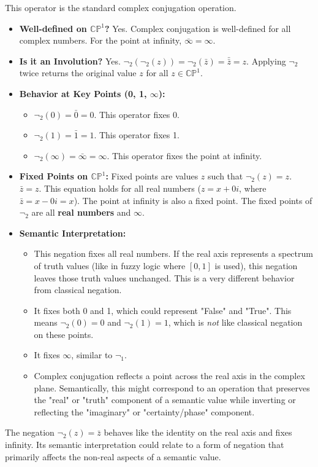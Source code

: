 	This operator is the standard complex conjugation operation.
	
	\begin{itemize}
		\item \textbf{Well-defined on $\mathbb{CP}^1$?} Yes. Complex conjugation is well-defined for all complex numbers. For the point at infinity, $\bar{\infty} = \infty$.
		
		\item \textbf{Is it an Involution?} Yes.
		$\neg_2(\neg_2(z)) = \neg_2(\bar{z}) = \bar{\bar{z}} = z$.
		Applying $\neg_2$ twice returns the original value $z$ for all $z \in \mathbb{CP}^1$.
		
		\item \textbf{Behavior at Key Points (0, 1, $\infty$):}
		\begin{itemize}
			\item $\neg_2(0) = \bar{0} = 0$. This operator fixes 0.
			\item $\neg_2(1) = \bar{1} = 1$. This operator fixes 1.
			\item $\neg_2(\infty) = \bar{\infty} = \infty$. This operator fixes the point at infinity.
		\end{itemize}
		
		\item \textbf{Fixed Points on $\mathbb{CP}^1$:} Fixed points are values $z$ such that $\neg_2(z) = z$.
		$\bar{z} = z$.
		This equation holds for all real numbers ($z = x + 0i$, where $\bar{z} = x - 0i = x$).
		The point at infinity is also a fixed point.
		The fixed points of $\neg_2$ are all \textbf{real numbers} and $\infty$.
		
		\item \textbf{Semantic Interpretation:}
		\begin{itemize}
			\item This negation fixes all real numbers. If the real axis represents a spectrum of truth values (like in fuzzy logic where $[0, 1]$ is used), this negation leaves those truth values unchanged. This is a very different behavior from classical negation.
			\item It fixes both 0 and 1, which could represent "False" and "True". This means $\neg_2(0) = 0$ and $\neg_2(1) = 1$, which is \textit{not} like classical negation on these points.
			\item It fixes $\infty$, similar to $\neg_1$.
			\item Complex conjugation reflects a point across the real axis in the complex plane. Semantically, this might correspond to an operation that preserves the "real" or "truth" component of a semantic value while inverting or reflecting the "imaginary" or "certainty/phase" component.
		\end{itemize}
	\end{itemize}
	The negation $\neg_2(z) = \bar{z}$ behaves like the identity on the real axis and fixes infinity. Its semantic interpretation could relate to a form of negation that primarily affects the non-real aspects of a semantic value.
	
